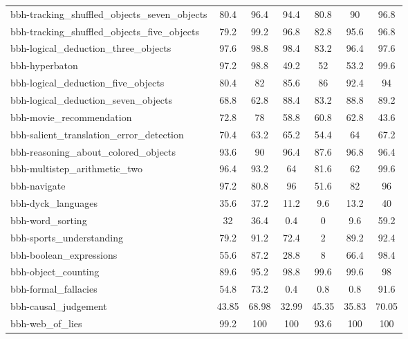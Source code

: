 \documentclass{article}
\begin{document}
\begin{table}[h]
{\begin{tabular}{lcccc>{\columncolor{blue!10}}c>{\columncolor{blue!10}}c}
bbh-tracking\_shuffled\_objects\_seven\_objects & 80.4  & 96.4  & 94.4  & 80.8  & 90    & 96.8  \\
bbh-tracking\_shuffled\_objects\_five\_objects  & 79.2  & 99.2  & 96.8  & 82.8  & 95.6  & 96.8  \\
bbh-logical\_deduction\_three\_objects          & 97.6  & 98.8  & 98.4  & 83.2  & 96.4  & 97.6  \\
bbh-hyperbaton                                  & 97.2  & 98.8  & 49.2  & 52    & 53.2  & 99.6  \\
bbh-logical\_deduction\_five\_objects           & 80.4  & 82    & 85.6  & 86    & 92.4  & 94    \\
bbh-logical\_deduction\_seven\_objects          & 68.8  & 62.8  & 88.4  & 83.2  & 88.8  & 89.2  \\
bbh-movie\_recommendation                       & 72.8  & 78    & 58.8  & 60.8  & 62.8  & 43.6  \\
bbh-salient\_translation\_error\_detection      & 70.4  & 63.2  & 65.2  & 54.4  & 64    & 67.2  \\
bbh-reasoning\_about\_colored\_objects          & 93.6  & 90    & 96.4  & 87.6  & 96.8  & 96.4  \\
bbh-multistep\_arithmetic\_two                  & 96.4  & 93.2  & 64    & 81.6  & 62    & 99.6  \\
bbh-navigate                                    & 97.2  & 80.8  & 96    & 51.6  & 82    & 96    \\
bbh-dyck\_languages                             & 35.6  & 37.2  & 11.2  & 9.6   & 13.2  & 40    \\
bbh-word\_sorting                               & 32    & 36.4  & 0.4   & 0     & 9.6   &59.2  \\
bbh-sports\_understanding                       & 79.2  & 91.2  & 72.4  & 2     & 89.2  & 92.4  \\
bbh-boolean\_expressions                        & 55.6  & 87.2  & 28.8  & 8     & 66.4  & 98.4  \\
bbh-object\_counting                            & 89.6  & 95.2  & 98.8  & 99.6  & 99.6  & 98    \\
bbh-formal\_fallacies                           & 54.8  & 73.2  & 0.4   & 0.8   & 0.8   & 91.6  \\
bbh-causal\_judgement                           & 43.85 & 68.98 & 32.99 & 45.35 & 35.83 & 70.05 \\
bbh-web\_of\_lies                               & 99.2  & 100   & 100   & 93.6  & 100   & 100 \\
\bottomrule
\end{tabular}}
\end{table}
\end{document}
